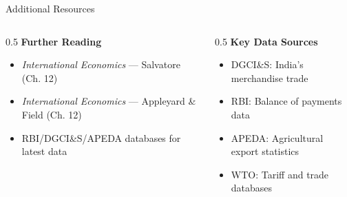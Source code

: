 \documentclass[
  ignorenonframetext,
  aspectratio=169,
]{beamer}
\makeatletter
\providecommand{\tightlist}{%
  \setlength{\itemsep}{0pt}\setlength{\parskip}{0pt}}
\let\quarto@originallabel\label
\DeclareRobustCommand*{\label}[1]{\quarto@originallabel{#1}}
\makeatother
\begin{document}
\begin{frame}{Additional Resources}
\label{additional-resources}
\begin{columns}[T]
\begin{column}{0.5\linewidth}
\textbf{Further Reading}

\begin{itemize}
\tightlist
\item
  \emph{International Economics} --- Salvatore (Ch. 12)
\item
  \emph{International Economics} --- Appleyard \& Field (Ch. 12)
\item
  RBI/DGCI\&S/APEDA databases for latest data
\end{itemize}
\end{column}

\begin{column}{0.5\linewidth}
\textbf{Key Data Sources}

\begin{itemize}
\tightlist
\item
  DGCI\&S: India's merchandise trade
\item
  RBI: Balance of payments data\\
\item
  APEDA: Agricultural export statistics
\item
  WTO: Tariff and trade databases
\end{itemize}
\end{column}
\end{columns}
\end{frame}
\end{document}
